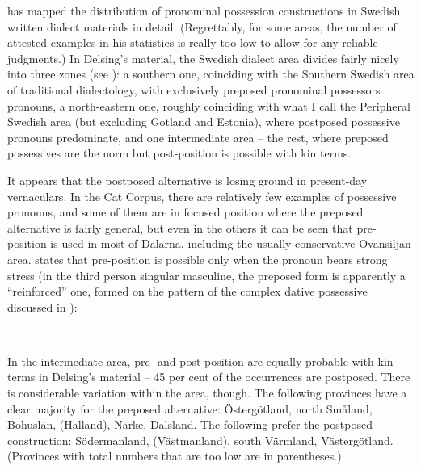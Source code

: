 {{{{{{{{\citet[32]{Delsing2003a} has mapped the distribution of pronominal possession constructions in Swedish written dialect materials in detail. (Regrettably, for some areas, the number of attested examples in his statistics is really too low to allow for any reliable judgments.) In Delsing’s material, the Swedish dialect area divides fairly nicely into three zones (see ): a southern one, coinciding with the Southern Swedish area of traditional dialectology, with exclusively preposed pronominal possessors pronouns, a north-eastern one, roughly coinciding with what I call the Peripheral Swedish area (but excluding Gotland and Estonia), where postposed possessive pronouns predominate, and one intermediate area – the rest, where preposed possessives are the norm but post-position is possible with kin terms.

It appears that the postposed alternative is losing ground in present-day vernaculars. In the Cat Corpus, there are relatively few examples of possessive pronouns, and some of them are in focused position where the preposed alternative is fairly general, but even in the others it can be seen that pre-position is used in most of Dalarna, including the usually conservative Ovansiljan area. \citet[111]{Levander1909} states that pre-position is possible only when the pronoun bears strong stress (in the third person singular masculine, the preposed form is apparently a “reinforced” one, formed on the pattern of the complex dative possessive discussed in ):

\ea
{}\\
\z
\z

In the intermediate area, pre- and post-position are equally probable with kin terms in Delsing’s material – 45 per cent of the occurrences are postposed. There is considerable variation within the area, though. The following provinces have a clear majority for the preposed alternative: Östergötland, north Småland, Bohuslän, (Halland), Närke, Dalsland. The following prefer the postposed construction: Södermanland, (Västmanland), south Värmland, Västergötland. (Provinces with total numbers that are too low are in parentheses.)

}}}}}}}}

